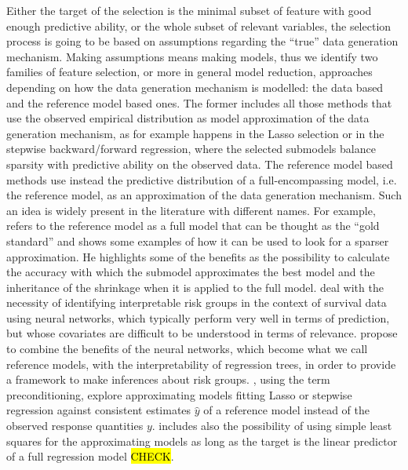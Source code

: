 \documentclass[american,]{article}
\theoremstyle{definition}
\begin{document}
Either the target of the selection is the minimal subset of feature with good enough predictive ability, or the whole subset of relevant variables, the selection process is going to be based on assumptions regarding the ``true'' data generation mechanism. Making assumptions means making models, thus we identify two families of feature selection, or more in general model reduction, approaches depending on how the data generation mechanism is modelled: the data based and the reference model based ones. The former includes all those methods that use the observed empirical distribution as model approximation of the data generation mechanism, as for example happens in the Lasso selection \cite{paper:tibshirani_lasso} or in the stepwise backward/forward regression, where the selected submodels balance sparsity with predictive ability on the observed data. The reference model based methods use instead the predictive distribution of a full-encompassing model, i.e. the reference model, as an approximation of the data generation mechanism. Such an idea is widely present in the literature with different names. For example, \cite{book:harrell} refers to the reference model as a full model that can be thought as the ``gold standard'' and shows some examples of how it can be used to look for a sparser approximation. He highlights some of the benefits as the possibility to calculate the accuracy with which the submodel approximates the best model and the inheritance of the shrinkage when it is applied to the full model. \cite{paper:faraggi_nn} deal with the necessity of identifying interpretable risk groups in the context of survival data using neural networks, which typically perform very well in terms of prediction, but whose covariates are difficult to be understood in terms of relevance. \cite{paper:faraggi_nn} propose to combine the benefits of the neural networks, which become what we call reference models, with the interpretability of regression trees, in order to provide a framework to make inferences about risk groups. \cite{paper:paul_preconditioning}, using the term preconditioning, explore approximating models fitting Lasso or stepwise regression against consistent estimates $\hat{y}$ of a reference model instead of the observed response quantities $y$. \cite{book:harrell} includes also the possibility of using simple least squares for the approximating models as long as the target is the linear predictor of a full regression model \hl{CHECK}.
\\
\end{document}
